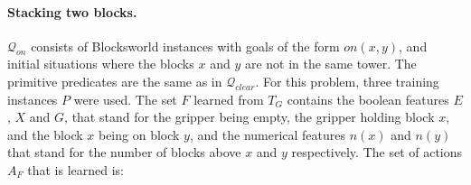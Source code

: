 \documentclass[letterpaper]{article} %
\newcommand{\Q}{\mathcal{Q}}
\begin{document}
%

\paragraph{Stacking two blocks.}
$\Q_{on}$ consists  of Blocksworld instances with goals of the form $on(x,y)$,
and initial situations  where the blocks $x$ and $y$ are not in the same tower.
The primitive predicates are the same as in $\Q_{clear}$.
For this problem, three training instances $P$ were used.
The set $F$ learned  from $T_G$ contains
% 
the boolean features  $E$, $X$ and $G$,  that stand for the gripper
being empty, the gripper holding block $x$, and the block $x$ being
on block $y$, and the numerical features  $n(x)$ and $n(y)$ that stand
for the number of blocks above $x$ and $y$ respectively.
%
The set of actions  $A_F$ that is learned is:
\end{document}
